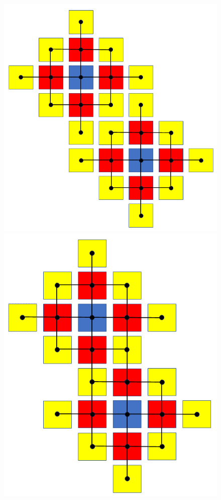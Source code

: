 \begin{figure}
    \centering
    \begin{minipage}{0.53\linewidth}
        \includegraphics[width=0.99\linewidth]{Chapters/ProjROMs/Images/load_balancing_withEdgeCuts_noSyms.png}
    \end{minipage}
    \centering
    \begin{minipage}{0.45\linewidth}
        \includegraphics[width=0.99\linewidth]{Chapters/ProjROMs/Images/load_balancing_noEdgeCuts_noSyms.png}

\end{minipage}
\end{figure}
